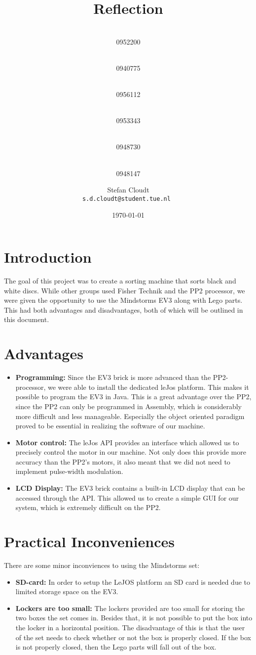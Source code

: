 \documentclass[a4paper,oneside,11pt]{article}
\title{\vspace{-\baselineskip}\sffamily\bfseries Reflection}
\author{
	\makebox[.25\linewidth]{Sergio van Amerongen}\\0952200 \and
	\makebox[.25\linewidth]{Stefan Cloudt}\\0940775 \and
	\makebox[.25\linewidth]{Daan de Graaf}\\0956112 \and
	\makebox[.25\linewidth]{Robert van Lente}\\0953343 \and
	\makebox[.25\linewidth]{Tom Peters}\\0948730 \and
	\makebox[.25\linewidth]{Berrie Trippe}\\0948147 
	\and \makebox[.75\linewidth]{\textbf{Responsible:}} \and
	Stefan Cloudt\\ \tt{s.d.cloudt@student.tue.nl}
}
\date{\today}
\begin{document}
\maketitle
\section{Introduction}
The goal of this project was to create a sorting machine that sorts black and white discs. While other groups used Fisher Technik and the PP2 processor, we were given the opportunity to use the Mindstorms EV3 along with Lego parts. This had both advantages and disadvantages, both of which will be outlined in this document. 

\section{Advantages}
\begin{itemize}
    \item \textbf{Programming:} Since the EV3 brick is more advanced than the PP2-processor, we were able to install the dedicated leJos platform. This makes it possible to program the EV3 in Java. This is a great advantage over the PP2, since the PP2 can only be programmed in Assembly, which is considerably more difficult and less manageable. Especially the object oriented paradigm proved to be essential in realizing the software of our machine.
    \item \textbf{Motor control:} The leJos API provides an interface which allowed us to precisely control the motor in our machine. Not only does this provide more accuracy than the PP2's motors, it also meant that we did not need to implement pulse-width modulation.
    \item \textbf{LCD Display:} The EV3 brick contains a built-in LCD display that can be accessed through the API. This allowed us to create a simple GUI for our system, which is extremely difficult on the PP2.
\end{itemize}

\section{Practical Inconveniences}
There are some minor inconviences to using the Mindstorms set:

\begin{itemize}
    \item \textbf{SD-card:} In order to setup the LeJOS platform an SD card is needed due to limited storage space on the EV3.
    \item \textbf{Lockers are too small:} The lockers provided are too small for storing the two boxes the set comes in. Besides that, it is not possible to put the box into the locker in a horizontal position. The disadvantage of this is that the user of the set needs to check whether or not the box is properly closed. If the box is not properly closed, then the Lego parts will fall out of the box.
\end{itemize}
\end{document}
